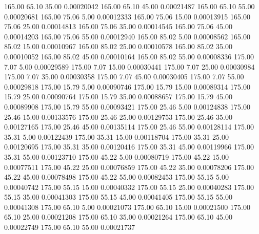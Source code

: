     165.00     65.10     35.00     0.00020042
    165.00     65.10     45.00     0.00021487
    165.00     65.10     55.00     0.00020681
    165.00     75.06      5.00     0.00012333
    165.00     75.06     15.00     0.00013915
    165.00     75.06     25.00     0.00014813
    165.00     75.06     35.00     0.00014545
    165.00     75.06     45.00     0.00014203
    165.00     75.06     55.00     0.00012940
    165.00     85.02      5.00     0.00008562
    165.00     85.02     15.00     0.00010967
    165.00     85.02     25.00     0.00010578
    165.00     85.02     35.00     0.00010052
    165.00     85.02     45.00     0.00010164
    165.00     85.02     55.00     0.00008336
    175.00      7.07      5.00     0.00029589
    175.00      7.07     15.00     0.00030441
    175.00      7.07     25.00     0.00030984
    175.00      7.07     35.00     0.00030358
    175.00      7.07     45.00     0.00030405
    175.00      7.07     55.00     0.00029818
    175.00     15.79      5.00     0.00090746
    175.00     15.79     15.00     0.00089314
    175.00     15.79     25.00     0.00090764
    175.00     15.79     35.00     0.00088657
    175.00     15.79     45.00     0.00089908
    175.00     15.79     55.00     0.00093421
    175.00     25.46      5.00     0.00124838
    175.00     25.46     15.00     0.00133576
    175.00     25.46     25.00     0.00129753
    175.00     25.46     35.00     0.00127165
    175.00     25.46     45.00     0.00135114
    175.00     25.46     55.00     0.00128114
    175.00     35.31      5.00     0.00122439
    175.00     35.31     15.00     0.00118704
    175.00     35.31     25.00     0.00120695
    175.00     35.31     35.00     0.00120416
    175.00     35.31     45.00     0.00119966
    175.00     35.31     55.00     0.00123710
    175.00     45.22      5.00     0.00080719
    175.00     45.22     15.00     0.00077511
    175.00     45.22     25.00     0.00076859
    175.00     45.22     35.00     0.00078206
    175.00     45.22     45.00     0.00078498
    175.00     45.22     55.00     0.00082453
    175.00     55.15      5.00     0.00040742
    175.00     55.15     15.00     0.00040332
    175.00     55.15     25.00     0.00040283
    175.00     55.15     35.00     0.00041303
    175.00     55.15     45.00     0.00041405
    175.00     55.15     55.00     0.00041308
    175.00     65.10      5.00     0.00021073
    175.00     65.10     15.00     0.00021500
    175.00     65.10     25.00     0.00021208
    175.00     65.10     35.00     0.00021264
    175.00     65.10     45.00     0.00022749
    175.00     65.10     55.00     0.00021737
